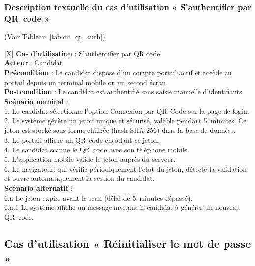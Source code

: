 \subsubsection{Description textuelle du cas d'utilisation « S'authentifier par QR~code »}
(Voir Tableau~\ref{tab:cu_qr_auth})

\begin{xltabular}{\linewidth}{|X|}
    \hline
    \textbf{Cas d'utilisation} : S'authentifier par QR code \\
    \hline
    \textbf{Acteur} : Candidat \\
    \hline
    \textbf{Précondition} : Le candidat dispose d'un compte portail actif et accède au portail depuis un terminal mobile ou un second écran. \\
    \hline
    \textbf{Postcondition} : Le candidat est authentifié sans saisie manuelle d'identifiants. \\
    \hline
    \textbf{Scénario nominal} : \\
    1. Le candidat sélectionne l'option \og Connexion par QR~Code \fg sur la page de login. \\
    2. Le système génère un jeton unique et sécurisé, valable pendant 5~minutes. Ce jeton est stocké sous forme chiffrée (hash SHA-256) dans la base de données. \\
    3. Le portail affiche un QR~code encodant ce jeton. \\
    4. Le candidat scanne le QR~code avec son téléphone mobile. \\
    5. L'application mobile valide le jeton auprès du serveur. \\
    6. Le navigateur, qui vérifie périodiquement l'état du jeton, détecte la validation et ouvre automatiquement la session du candidat. \\
    \hline
    \textbf{Scénario alternatif} : \\
    6.a Le jeton expire avant le scan (délai de 5~minutes dépassé). \\
    \hspace{0.5cm} 6.a.1 Le système affiche un message invitant le candidat à générer un nouveau QR~code. \\
    \hline
\caption{Description textuelle du CU « S'authentifier par QR code »}
\label{tab:cu_qr_auth}
\end{xltabular}

\subsection{Cas d'utilisation « Réinitialiser le mot de passe »}


